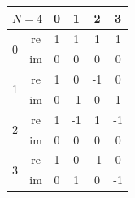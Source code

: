 \begin{center}
	\begin{tabular}{| c c c c c c |}
		\hline
		\multicolumn{2}{|c}{$N=4$} & \multicolumn{1}{c}{ \tiny 0} & \multicolumn{1}{c}{ \tiny 1} & \multicolumn{1}{c}{ \tiny 2} & \multicolumn{1}{c|}{ \tiny 3}      \\
		\hline
		\hline
		\multirow{2}{*}{0}         & re                           & 1                            & 1                            & 1                             & 1  \\
		                           & im                           & 0                            & 0                            & 0                             & 0  \\
		\hline\hline
		\multirow{2}{*}{1}         & re                           & 1                            & 0                            & -1                            & 0  \\
		                           & im                           & 0                            & -1                           & 0                             & 1  \\
		\hline\hline
		\multirow{2}{*}{2}         & re                           & 1                            & -1                           & 1                             & -1 \\
		                           & im                           & 0                            & 0                            & 0                             & 0  \\
		\hline\hline
		\multirow{2}{*}{3}         & re                           & 1                            & 0                            & -1                            & 0  \\
		                           & im                           & 0                            & 1                            & 0                             & -1 \\
		\hline
	\end{tabular}
\end{center}

